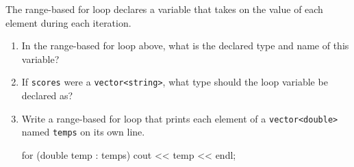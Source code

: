   \vskip -20pt

  \Q The range-based for loop declares a variable that takes on the
    value of each element during each iteration.
    \begin{enumerate}
      \itemsep 10pt
      \item In the range-based for loop above, what is the declared
        type and name of this variable?
        \hfill{}

      \item If {\tt scores} were a {\tt vector<string>}, what type should
        the loop variable be declared as?
        \hfill{}

      \item Write a range-based for loop that prints each element of
        a {\tt vector<double>} named {\tt temps} on its own line.
        \begin{answer}[0.75in]
          \begin{cpplst}
for (double temp : temps) {
    cout << temp << endl;
}
          \end{cpplst}
        \end{answer}
    \end{enumerate}

  \vskip -20pt

